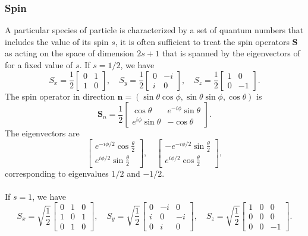\subsubsection{Spin}
A particular species of particle is characterized by a set of quantum numbers that includes the value of its spin $s$, it is often sufficient to treat the spin operators $\bm{S}$ as acting on the space of dimension
$2s+1$ that is spanned by the eigenvectors of for a fixed value of $s$. 
If $s= 1/2$, we have
\[S_x = \frac{1}{2} \left[ \begin{matrix} 0& 1\\ 1& 0\end{matrix} \right] , \quad S_y = \frac{1}{2} \left[ \begin{matrix} 0& -i\\ i& 0\end{matrix} \right] , \quad S_z = \frac{1}{2} \left[ \begin{matrix} 1& 0\\ 0& -1\end{matrix} \right].\]
The spin operator in direction $\bm{n} = (\sin\theta\cos\phi,\sin\theta\sin\phi,\cos\theta)$ is
\[\bm{S}_{n} = \frac{1}{2} \left[ \begin{matrix} \cos\theta& e^{-i\phi}\sin\theta\\ e^{i\phi}\sin\theta& -\cos\theta\end{matrix} \right].\]
The eigenvectors are
\[\left[ \begin{matrix} e^{-i\phi/2}\cos\frac{\theta}{2}\\ e^{i\phi/2}\sin\frac{\theta}{2} \end{matrix} \right] , \quad \left[ \begin{matrix} -e^{-i\phi/2}\sin\frac{\theta}{2}\\ e^{i\phi/2}\cos\frac{\theta}{2} \end{matrix} \right],\]
corresponding to eigenvalues $1/2$ and $-1/2$.
\\ \\
If $s= 1$, we have
\[S_x = \sqrt{\frac{1}{2}} \left[ \begin{matrix} 0& 1& 0\\ 1& 0& 1\\ 0& 1& 0\end{matrix} \right]  , \quad S_y = \sqrt{\frac{1}{2}} \left[ \begin{matrix} 0& -i& 0\\ i& 0& -i\\ 0& i& 0\end{matrix} \right] , \quad S_z = \sqrt{\frac{1}{2}} \left[ \begin{matrix} 1& 0& 0\\ 0& 0& 0\\ 0& 0& -1\end{matrix} \right].\]
